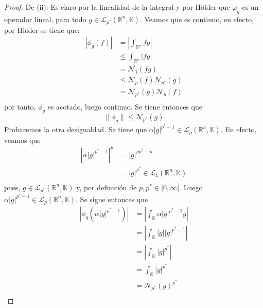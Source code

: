 \documentclass[12pt]{report}
\newcounter{it}
\theoremstyle{largebreak}
\newcommand\abs[1]{\ensuremath{\left|#1\right|}}
\newcommand{\N}[2]{\ensuremath{\mathcal{N}_{#1}\left(#2\right)}}
\begin{document}
\begin{proof}
        De (ii): Es claro por la linealidad de la integral y por Hölder que $\varphi_g$ es un operador lineal, para todo $g\in\mathcal{L}_{p^*}(\mathbb{R}^n,\mathbb{K})$. Veamos que es continuo, en efecto, por Hölder se tiene que:
        \begin{equation*}
            \begin{split}
                \abs{\phi_g(f)}&=\abs{\int_{\mathbb{R}^n}fg}\\
                 &\leq\int_{\mathbb{R}^n}\abs{fg}\\
                 &=\N{1}{fg}\\
                 &\leq\N{p}{f}\N{p^*}{g}\\
                 &=\N{p^*}{g}\N{p}{f}\\
            \end{split}
        \end{equation*}
        por tanto, $\phi_g$ es acotado, luego continuo. Se tiene entonces que
        \begin{equation*}
            \|\phi_g\|\leq\N{p^*}{g}
        \end{equation*}
        Probaremos la otra desigualdad. Se tiene que $\alpha\abs{g}^{ p^*-1}\in\mathcal{L}_p(\mathbb{R}^n,\mathbb{K})$. En efecto, veamos que
        \begin{equation*}
            \begin{split}
                \abs{\alpha\abs{g}^{ p^*-1}}^p&=\abs{g}^{ pp^*-p}\\
                &=\abs{g}^{p^*}\in\mathcal{L}_1(\mathbb{R}^n,\mathbb{K}) \\
            \end{split}
        \end{equation*}
        pues, $g\in\mathcal{L}_{ p^*}(\mathbb{R}^n,\mathbb{K})$ y, por definición de $p,p^*\in]0,\infty[$. Luego $\alpha\abs{g}^{ p^*-1}\in\mathcal{L}_p(\mathbb{R}^n,\mathbb{K})$. Se sigue entonces que
        \begin{equation*}
            \begin{split}
                \abs{\phi_g(\alpha\abs{g}^{p^*-1})}&=\abs{\int_{\mathbb{R}}\alpha\abs{g}^{ p^*-1}g}\\
                &=\abs{\int_{\mathbb{R}}\abs{g}\abs{g}^{ p^*-1}}\\
                &=\abs{\int_{\mathbb{R}}\abs{g}^{ p^*}}\\
                &=\int_{\mathbb{R}}\abs{g}^{ p^*}\\
                &=\N{p^*}{g}^{p^*}\\

\end{split}
\end{equation*}
\end{proof}
\end{document}
